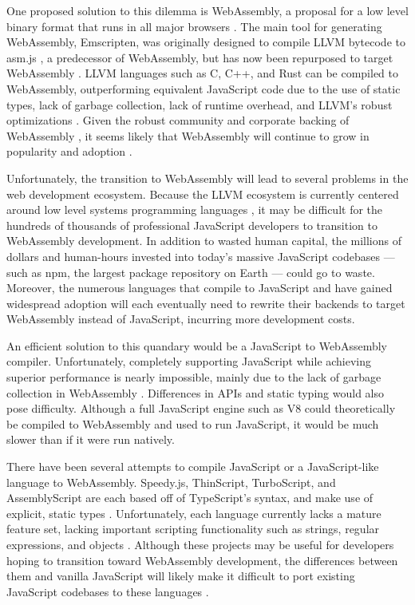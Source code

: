 \documentclass[12pt]{article}
\begin{document}
	One proposed solution to this dilemma is WebAssembly, a proposal for a low level binary format that runs in all major browsers \cite{Haas2017}. The main tool for generating WebAssembly, Emscripten, was originally designed to compile LLVM bytecode to asm.js \cite{Zakai2011}, a predecessor of WebAssembly, but has now been repurposed to target WebAssembly \cite{Haas2017}. LLVM languages such as C, C++, and Rust can be compiled to WebAssembly, outperforming equivalent JavaScript code due to the use of static types, lack of garbage collection, lack of runtime overhead, and LLVM's robust optimizations \cite{Haas2017}. Given the robust community and corporate backing of WebAssembly \cite{Chartrand2016}, it seems likely that WebAssembly will continue to grow in popularity and adoption \cite{Bryant}.
	
	Unfortunately, the transition to WebAssembly will lead to several problems in the web development ecosystem. Because the LLVM ecosystem is currently centered around low level systems programming languages \cite{Zakai2011}, it may be difficult for the hundreds of thousands of professional JavaScript developers \cite{Byrne2016} to transition to WebAssembly development. In addition to wasted human capital, the millions of dollars and human-hours invested into today's massive JavaScript codebases --- such as npm, the largest package repository on Earth \cite{Brown2017} --- could go to waste. Moreover, the numerous languages that compile to JavaScript and have gained widespread adoption will each eventually need to rewrite their backends to target WebAssembly instead of JavaScript, incurring more development costs.
	
	An efficient solution to this quandary would be a JavaScript to WebAssembly compiler. Unfortunately, completely supporting JavaScript while achieving superior performance is nearly impossible, mainly due to the lack of garbage collection in WebAssembly \cite{Haas2017}. Differences in APIs and static typing would also pose difficulty. Although a full JavaScript engine such as V8 could theoretically be compiled to WebAssembly and used to run JavaScript, it would be much slower than if it were run natively.
	
	There have been several attempts to compile JavaScript or a JavaScript-like language to WebAssembly. Speedy.js, ThinScript, TurboScript, and AssemblyScript are each based off of TypeScript's syntax, and make use of explicit, static types \cite{Reiser2017}\cite{ThinScript}\cite{TurboScript}\cite{AssemblyScript}. Unfortunately, each language currently lacks a mature feature set, lacking important scripting functionality such as strings, regular expressions, and objects \cite{Reiser2017}\cite{ThinScript}\cite{TurboScript}\cite{AssemblyScript}. Although these projects may be useful for developers hoping to transition toward WebAssembly development, the differences between them and vanilla JavaScript will likely make it difficult to port existing JavaScript codebases to these languages \cite{AssemblyScript}.
	
\end{document}
